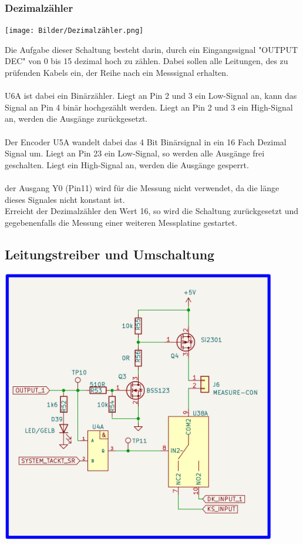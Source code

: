 \newpage
\subsubsection{Dezimalzähler}

\begin{center}
\texttt{[image: Bilder/Dezimalzähler.png]}
\end{center}

Die Aufgabe dieser Schaltung besteht darin, durch ein Eingangssignal "OUTPUT DEC" von 0 bis 15 dezimal hoch zu zählen. Dabei sollen alle Leitungen, des zu prüfenden Kabels ein, der Reihe nach ein Messsignal erhalten.
\\
\\
U6A ist dabei ein Binärzähler. Liegt an Pin 2 und 3 ein Low-Signal an, kann das Signal an Pin 4 binär hochgezählt werden. Liegt an Pin 2 und 3 ein High-Signal an, werden die Ausgänge zurückgesetzt.
\\
\\
Der Encoder U5A wandelt dabei das 4 Bit Binärsignal in ein 16 Fach Dezimal Signal um. Liegt an Pin 23 ein Low-Signal, so werden alle Ausgänge frei geschalten. Liegt ein High-Signal an, werden die Ausgänge gesperrt.
\\
\\
der Ausgang Y0 (Pin11) wird für die Messung nicht verwendet, da die länge dieses Signales nicht konstant ist.
\\
Erreicht der Dezimalzähler den Wert 16, so wird die Schaltung zurückgesetzt und gegebenenfalls die Messung einer weiteren Messplatine gestartet.


\newpage
\subsection{Leitungstreiber und Umschaltung}

\begin{center}
\includegraphics[width=12cm]{Bilder/Leitungstreiber.png}
\end{center}

